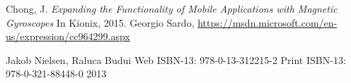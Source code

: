 \begin{thebibliography}{9}

  Chong, J. 
  \textit{Expanding the Functionality of Mobile Applications with Magnetic Gyroscopes} 
  In Kionix,
  2015.
  Georgio Sardo,
  \url{https://msdn.microsoft.com/en-us/expression/cc964299.aspx}
\end{thebibliography}
Jakob Nielsen, Raluca Budui
Web ISBN-13: 978-0-13-312215-2
Print ISBN-13: 978-0-321-88448-0
2013